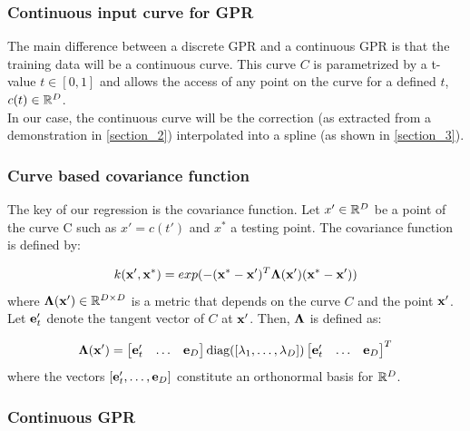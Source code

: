 \subsubsection{Continuous input curve for GPR}

The main difference between a discrete GPR and a continuous GPR is that the training data will be a continuous curve. This curve $C$ is parametrized by a t-value $t\in [0,1]$ and allows the access of any point on the curve for a defined $t$, $c(t) \in \mathbb{R}^D$.\\
In our case, the continuous curve will be the correction (as extracted from a demonstration in \autoref{section_2}) interpolated into a spline (as shown in \autoref{section_3}).

\subsubsection{Curve based covariance function}

The key of our regression is the covariance function. Let $x' \in \mathbb{R}^D$ be a point of the curve C such as $x'=c(t')$ and $x^*$ a testing point. The covariance function is defined by:

\begin{equation}
  \label{equ_covardef}
  k(\boldsymbol{\mathbf{x}}', \boldsymbol{\mathbf{x}}^*) = exp(-(\boldsymbol{\mathbf{x}}^* - \boldsymbol{\mathbf{x}}')^T\boldsymbol{\mathbf{{\Lambda}}}(\boldsymbol{\mathbf{x}}') (\boldsymbol{\mathbf{x}}^* - \boldsymbol{\mathbf{x}}'))
\end{equation}
where $\boldsymbol{\mathbf{{\Lambda}}}(\boldsymbol{\mathbf{x}}') \in \mathbb{R}^{D \times D}$ is a metric that depends on the curve $C$ and the point $\boldsymbol{\mathbf{x}}'$. Let $\boldsymbol{\mathbf{e}}_t'$ denote the tangent vector of $C$ at $\boldsymbol{\mathbf{x}}'$. Then, $\boldsymbol{\mathbf{{\Lambda}}}$ is defined as:

\begin{equation}
  \label{equ_lambdadefinition}
  \boldsymbol{\mathbf{{\Lambda}}}(\boldsymbol{\mathbf{x}}') =
  \begin{bmatrix}
    \boldsymbol{\mathbf{e}}_t' & \hdots & \boldsymbol{\mathbf{e}}_D
  \end{bmatrix}
  \text{diag}([\lambda_1,\hdots, \lambda_D])
  \begin{bmatrix}
    \boldsymbol{\mathbf{e}}_t' & \hdots & \boldsymbol{\mathbf{e}}_D
  \end{bmatrix}^T
\end{equation}
where the vectors $[\boldsymbol{\mathbf{e}}_t', \hdots, \boldsymbol{\mathbf{e}}_D]$ constitute an orthonormal basis for $\mathbb{R}^D$. 

\subsubsection{Continuous GPR}

